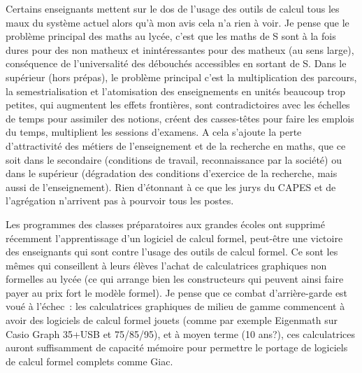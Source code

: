 \documentclass[a4paper,11pt]{article}
\begin{document}
Certains enseignants mettent sur le dos de l'usage des outils de
calcul tous les maux du syst\`eme actuel alors qu'\`a mon avis cela n'a rien
\`a voir. Je pense que le probl\`eme principal des maths au lyc\'ee, 
c'est que les maths de S sont \`a la fois dures pour des non matheux
et inint\'eressantes pour des matheux (au sens large), cons\'equence
de l'universalit\'e des d\'ebouch\'es accessibles en sortant de S.
Dans le sup\'erieur (hors pr\'epas), le probl\`eme principal c'est
la multiplication des parcours, la semestrialisation 
et l'atomisation des enseignements
en unit\'es beaucoup trop petites, qui augmentent les effets
fronti\`eres, sont contradictoires avec les \'echelles de temps
pour assimiler des notions, cr\'eent des casses-t\^etes pour faire
les emplois du temps, multiplient les sessions d'examens. 
A cela s'ajoute la perte d'attractivit\'e des m\'etiers de
l'enseignement et de la recherche en maths, que ce soit
dans le secondaire (conditions de travail, reconnaissance
par la soci\'et\'e) ou dans le sup\'erieur (d\'egradation
des conditions d'exercice de la recherche, mais aussi
de l'enseignement). Rien d'\'etonnant \`a ce que les jurys
du CAPES et de l'agr\'egation n'arrivent pas \`a
pourvoir tous les postes.

Les programmes des classes pr\'eparatoires aux grandes \'ecoles
ont supprim\'e r\'ecemment l'apprentissage d'un logiciel de calcul
formel, peut-\^etre une victoire des enseignants qui sont contre
l'usage des outils de calcul formel. Ce sont les m\^emes qui conseillent
\`a leurs \'el\`eves l'achat de calculatrices graphiques non formelles
au lyc\'ee (ce qui arrange bien les constructeurs qui peuvent ainsi
faire payer au prix fort le mod\`ele formel). 
Je pense que ce combat d'arri\`ere-garde est vou\'e \`a l'\'echec~:
les calculatrices graphiques de milieu de gamme commencent
\`a avoir des logiciels de calcul formel jouets (comme
par exemple Eigenmath sur Casio Graph 35+USB et 75/85/95),
et \`a moyen terme (10 ans?), ces calculatrices 
auront suffisamment de capacit\'e m\'emoire pour
permettre le portage de logiciels de calcul formel complets comme Giac.
\end{document}
